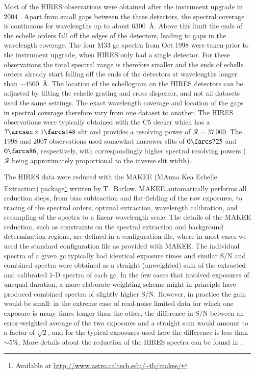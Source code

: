 \documentclass{aa}
\begin{document}
Most of the HIRES observations were obtained after the instrument upgrade in 2004 \citep{Butler2017}. Apart from small gaps between the three detectors, the spectral coverage is continuous for wavelengths up to about 6300~\AA. Above this limit the ends of the echelle orders fall off the edges of the detectors, leading to gaps in the wavelength coverage. 
The four M33 \ac{gc} spectra from Oct 1998 were taken prior to the instrument upgrade, when HIRES only had a single detector. For these observations the total spectral range is therefore smaller and the ends of echelle orders already start falling off the ends of the detectors at wavelengths longer than $\sim4500$~\AA . The location of the echellogram on the HIRES detectors can be adjusted by tilting the echelle grating and cross disperser, and not all datasets used the same settings. The exact wavelength coverage and location of the gaps in spectral coverage therefore vary from one dataset to another. The HIRES observations were typically obtained with the C5 decker which has a $7\arcsec\times1\farcs148$ slit and provides a resolving power of $\mathcal{R}=37\, 000$. The 1998 and 2007 observations used somewhat narrower slits of $0\farcs725$ and $0\farcs86$, respectively, with correspondingly higher spectral resolving powers ($\mathcal{R}$ being approximately proportional to the inverse slit width). 

The HIRES data were reduced with the MAKEE (MAuna Kea Echelle Extraction) package\footnote{Available at \url{http://www.astro.caltech.edu/~tb/makee/}} written by T.\ Barlow. MAKEE automatically performs all reduction steps, from bias subtraction and flat-fielding of the raw exposures, to tracing of the spectral orders, optimal extraction, wavelength calibration, and resampling of the spectra to a linear wavelength scale.  
The details of the MAKEE reduction, such as constraints on the spectral extraction and background determination regions, are defined in a configuration file, where in most cases we used the standard configuration file as provided with MAKEE. 
The individual spectra of a given \ac{gc} typically had identical exposure times and similar S/N and combined spectra were obtained as a straight (unweighted) sum of the extracted and calibrated 1-D spectra of each \ac{gc}. In the few cases that involved exposures of unequal duration, a more elaborate weighting scheme might in principle have produced combined spectra of slightly higher S/N. However, in practice the gain would be small: in the extreme case of read-noise limited data for which one exposure is many times longer than the other, the difference in S/N between an error-weighted average of the two exposures and a straight sum would amount to a factor of $\sqrt{2}$, and for the typical exposures used here the difference is less than $\sim5$\%. More details about the reduction of the HIRES spectra can be found in \citet{Larsen2018}.
\end{document}
